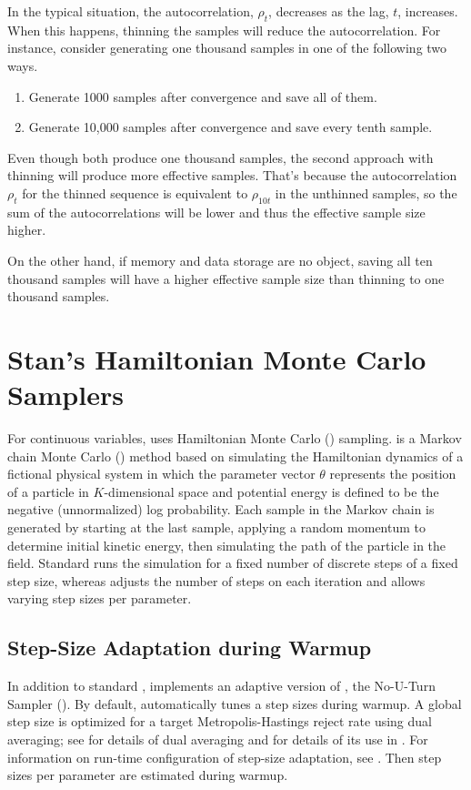 In the typical situation, the autocorrelation, $\rho_t$, decreases as
the lag, $t$, increases.  When this happens, thinning the samples will
reduce the autocorrelation.  For instance, consider generating one
thousand samples in one of the following two ways.
%
\begin{enumerate}
\item Generate 1000 samples after convergence and save all of
  them.
\item Generate 10,000 samples after convergence and save every tenth
  sample.
\end{enumerate}
%
Even though both produce one thousand samples, the second approach
with thinning will produce more effective samples.  That's because the
autocorrelation $\rho_t$ for the thinned sequence is equivalent to
$\rho_{10t}$ in the unthinned samples, so the sum of the autocorrelations
will be lower and thus the effective sample size higher.  

On the other hand, if memory and data storage are no object, saving all
ten thousand samples will have a higher effective sample size than
thinning to one thousand samples.

\section{Stan's Hamiltonian Monte Carlo Samplers}\label{intro-samplers.section}

For continuous variables, \Stan uses Hamiltonian Monte Carlo (\HMC)
sampling. \HMC is a Markov chain Monte Carlo (\MCMC) method based on
simulating the Hamiltonian dynamics of a fictional physical system in
which the parameter vector $\theta$ represents the position of a
particle in $K$-dimensional space and potential energy is defined to
be the negative (unnormalized) log probability.  Each sample in the
Markov chain is generated by starting at the last sample, applying a
random momentum to determine initial kinetic energy, then simulating
the path of the particle in the field.  Standard \HMC runs the
simulation for a fixed number of discrete steps of a fixed step size,
whereas \NUTS adjusts the number of steps on each iteration and allows
varying step sizes per parameter.



\subsection{Step-Size Adaptation during Warmup}

In addition to standard \HMC, \Stan implements an adaptive version of
\HMC, the No-U-Turn Sampler (\NUTS).  By default, \NUTS automatically
tunes a step sizes during warmup.  A global step size is optimized for
a target Metropolis-Hastings reject rate using dual averaging; see
\citep{Nesterov:2009} for details of dual averaging and
\citep{Hoffman-Gelman:2012} for details of its use in \Stan.  For
information on run-time configuration of step-size adaptation, see
.  Then step sizes per parameter
are estimated during warmup.  

